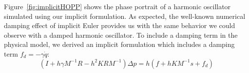 \documentclass[11pt, oneside, a4paper]{memoir}
\begin{document}
Figure~\ref{fig:implicitHOPP} shows the phase portrait of a harmonic oscillator simulated using our implicit formulation.
As expected, the well-known numerical damping effect of implicit Euler provides us with the same behavior we could observe with a damped harmonic oscillator.
To include a damping term in the physical model, we derived an implicit formulation which includes a damping term $f_{d} = -\gamma \dot{q}$:
\begin{equation}
	\label{eq:arpsLinearSystemDamped}
	( I + h\gamma M^{-1}R -h^{2}KRM^{-1} ) \Delta p = h( f + h KM^{-1}s + f_{d})
\end{equation}
\end{document}
